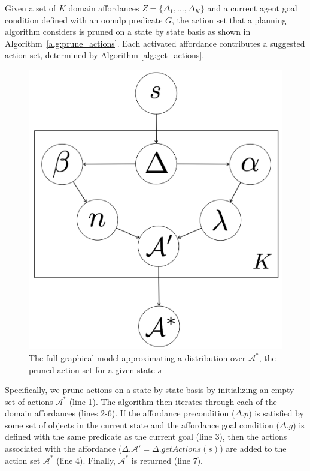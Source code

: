\documentclass[letterpaper]{article}
\begin{document}
Given a set of $K$ domain affordances $Z = \{\Delta_1, ..., \Delta_K\}$ and a current 
agent goal condition defined with an \gls{oomdp} predicate $G$, the action set that a 
planning algorithm considers is pruned on a state by state basis as shown in 
Algorithm~\ref{alg:prune_actions}.  Each 
activated affordance contributes a suggested action set, determined by Algorithm \ref{alg:get_actions}. 

\begin{figure}
\centering
\includegraphics[scale=0.14]{figures/learn_graphical_model.png}%
  \caption{The full graphical model approximating a distribution over $\mathcal{A}^*$, the pruned action set for a given state $s$}
  \label{fig:graphical_model}
\end{figure}

Specifically, we prune actions on a state by state basis
by initializing an empty set of actions $\mathcal{A}^*$ (line 1). The algorithm then iterates
through each of the domain affordances (lines 2-6). If the affordance
precondition ($\Delta.p$) is satisfied by some set of objects in the current state
and the affordance goal condition ($\Delta.g$) is defined with the same predicate
as the current goal (line 3), then the actions associated with the affordance ($\Delta.\mathcal{A}' = \Delta.getActions(s)$) are added to the action set $\mathcal{A}^*$ (line 4). Finally, $\mathcal{A}^*$ is returned (line 7).
\end{document}
